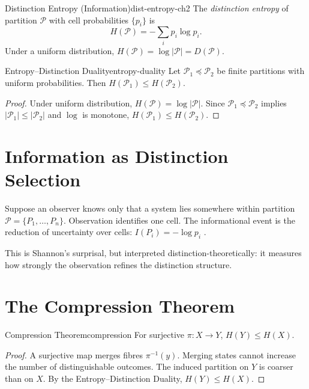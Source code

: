 \documentclass[12pt,twoside,openright]{book}
\newcommand{\partition}{\mathcal{P}}
\begin{document}
\begin{definition}{Distinction Entropy (Information)}{dist-entropy-ch2}
  The \emph{distinction entropy} of partition $\partition$
  with cell probabilities $\{p_i\}$ is
  \[
    H(\partition) = -\sum_i p_i \log p_i.
  \]
  Under a uniform distribution,
  $H(\partition) = \log|\partition| = D(\partition)$.
\end{definition}

\begin{theorem}{Entropy--Distinction Duality}{entropy-duality}
  Let $\partition_1 \preceq \partition_2$ be finite
  partitions with uniform probabilities. Then
  $H(\partition_1) \le H(\partition_2)$.
\end{theorem}

\begin{proof}
  Under uniform distribution, $H(\partition) = \log|\partition|$.
  Since $\partition_1 \preceq \partition_2$ implies
  $|\partition_1| \le |\partition_2|$ and $\log$ is
  monotone, $H(\partition_1) \le H(\partition_2)$.
\end{proof}

\section{Information as Distinction Selection}
\label{sec:ch2-selection}

Suppose an observer knows only that a system lies
somewhere within partition $\partition = \{P_1,\ldots,P_n\}$.
Observation identifies one cell. The informational event
is the reduction of uncertainty over cells:
$I(P_i) = -\log p_i$ \parencite{shannon1948,mackay2003}.

This is Shannon's surprisal, but interpreted
distinction-theoretically: it measures how strongly the
observation refines the distinction structure.

\section{The Compression Theorem}
\label{sec:ch2-compression}

\begin{theorem}{Compression Theorem}{compression}
  For surjective $\pi: X \to Y$, $H(Y) \le H(X)$.
\end{theorem}

\begin{proof}
  A surjective map merges fibres $\pi^{-1}(y)$.
  Merging states cannot increase the number of
  distinguishable outcomes. The induced partition on $Y$
  is coarser than on $X$. By the Entropy--Distinction
  Duality, $H(Y) \le H(X)$.
\end{proof}
\end{document}
